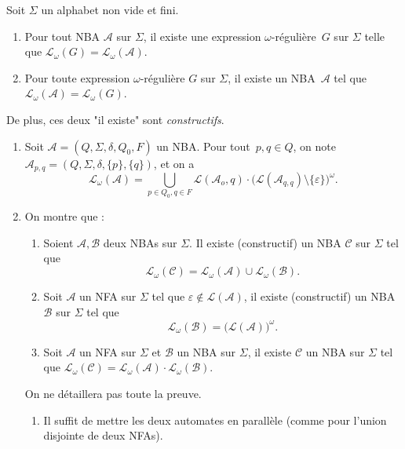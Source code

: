 \documentclass[./main]{subfiles}
\begin{document}
  \begin{thm}
    Soit $\Sigma$ un alphabet non vide et fini.
    \begin{enumerate}
      \item Pour tout NBA $\mathcal{A}$ sur $\Sigma$, il existe une expression $\omega$-régulière~$G$ sur $\Sigma$ telle que $\mathcal{L}_\omega(G) = \mathcal{L}_\omega(\mathcal{A})$.
      \item Pour toute expression $\omega$-régulière $G$ sur $\Sigma$, il existe un NBA~$\mathcal{A}$ tel que $\mathcal{L}_\omega(\mathcal{A}) = \mathcal{L}_\omega(G)$.
    \end{enumerate}
    De plus, ces deux "il existe" sont \textit{constructifs}.
  \end{thm}
  \begin{prv}
    \begin{enumerate}
      \item Soit $\mathcal{A} = (Q, \Sigma, \delta, Q_0, F)$ un NBA.
        Pour tout~$p, q \in Q$, on note $\mathcal{A}_{p, q} = (Q, \Sigma, \delta, \{p\} , \{q\})$, et on a 
        \[
        \mathcal{L}_\omega(\mathcal{A}) = \bigcup_{p \in Q_0, q \in F} \mathcal{L}(\mathcal{A}_o, q) \cdot \big(\mathcal{L}(\mathcal{A}_{q, q}) \setminus \{\varepsilon\}\big)^\omega
        .\]
      \item On montre que :
        \begin{enumerate}
          \item Soient $\mathcal{A}, \mathcal{B}$ deux NBAs sur $\Sigma$. Il existe (constructif) un NBA $\mathcal{C}$ sur $\Sigma$ tel que 
            \[
            \mathcal{L}_\omega(\mathcal{C}) = \mathcal{L}_\omega(\mathcal{A}) \cup \mathcal{L}_\omega(\mathcal{B})
            .\]
          \item Soit $\mathcal{A}$ un NFA sur $\Sigma$ tel que $\varepsilon \not\in \mathcal{L}(\mathcal{A})$, il existe (constructif) un NBA $\mathcal{B}$ sur $\Sigma$ tel que 
            \[
              \mathcal{L}_\omega(\mathcal{B}) =\big(\mathcal{L}(\mathcal{A})\big)^\omega
            .\] 
          \item Soit $\mathcal{A}$ un NFA sur $\Sigma$ et $\mathcal{B}$ un NBA sur  $\Sigma$, il existe $\mathcal{C}$ un NBA sur $\Sigma$ tel que $\mathcal{L}_\omega(\mathcal{C}) = \mathcal{L}_\omega(\mathcal{A}) \cdot \mathcal{L}_\omega(\mathcal{B})$.
        \end{enumerate}
        On ne détaillera pas toute la preuve.
        \begin{enumerate}
          \item Il suffit de mettre les deux automates en parallèle (comme pour l'union disjointe de deux NFAs).

\end{enumerate}
\end{enumerate}
\end{prv}
\end{document}
